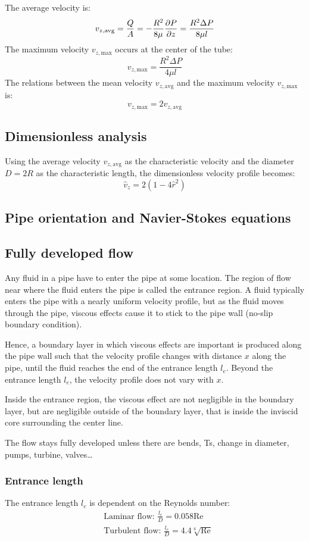 \documentclass[10pt, twocolumn]{article}
\begin{document}
The average velocity is:
\[
  v_{z,\mathrm{avg}} = \frac{Q}{A} = -\frac{R^2 }{8 \mu}\frac{\partial P}{\partial z} = \frac{R^2 \Delta P}{8\mu l}
\]
The maximum velocity \(v_{z,\mathrm{max}}\) occurs at the center of the tube:
\[
  v_{z,\mathrm{max}} = \frac{R^2 \Delta P}{4\mu l}
\]
The relations between the mean velocity \(v_{z,\mathrm{avg}}\) and the maximum velocity \(v_{z,\mathrm{max}}\) is:
\[
  v_{z,\mathrm{max}} = 2 v_{z,\mathrm{avg}}
\]


\subsection{Dimensionless analysis}
Using the average velocity \(v_{z,\mathrm{avg}}\) as the characteristic velocity and the diameter \(D = 2R\) as the characteristic length, the dimensionless velocity profile becomes:
\[
  \hat{v}_z = 2(1 - 4 \hat{r}^2)
\]


\subsection{Pipe orientation and Navier-Stokes equations}



\subsection{Fully developed flow}
Any fluid in a pipe have to enter the pipe at some location.
The region of flow near where the fluid enters the pipe is called the entrance region.
A fluid typically enters the pipe with a nearly uniform velocity profile, but as the fluid moves through the pipe, viscous effects cause it to stick to the pipe wall (no-slip boundary condition).

Hence, a boundary layer in which viscous effects are important is produced along the pipe wall such that the velocity profile changes with distance \(x\) along the pipe, until the fluid reaches the end of the entrance length \(l_e\).
Beyond the entrance length \(l_e\), the velocity profile does not vary with \(x\).

Inside the entrance region, the viscous effect are not negligible in the boundary layer, but are negligible outside of the boundary layer, that is inside the inviscid core surrounding the center line.

The flow stays fully developed unless there are bends, Ts, change in diameter, pumps, turbine, valves\dots{}


\subsubsection{Entrance length}
The entrance length \(l_e\) is dependent on the Reynolds number:
\begin{align*}
   & \text{Laminar flow: } \frac{l_e}{D} = 0.058 \mathrm{Re}           \\
   & \text{Turbulent flow: } \frac{l_e}{D} = 4.4 \sqrt[6]{\mathrm{Re}} \\
\end{align*}
\end{document}
